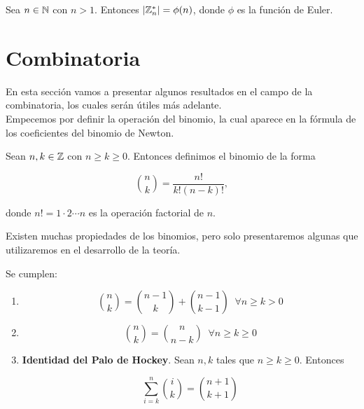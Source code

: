 \begin{proposicion}
	Sea $n \in \mathbb{N}$ con $n > 1$. Entonces $|\mathbb{Z}_n^*| = \phi(n)$, donde $\phi$ es la función de Euler.
\end{proposicion}

\section{Combinatoria}

En esta sección vamos a presentar algunos resultados en el campo de la combinatoria, los cuales serán útiles más adelante.\\

Empecemos por definir la operación del binomio, la cual aparece en la fórmula de los coeficientes del binomio de Newton.

\begin{definicion}
	Sean $n, k \in \mathbb{Z}$ con $n \geq k \geq 0$. Entonces definimos el binomio de la forma
	
	\begin{equation}\label{formula_binomio}
	\binom{n}{k} = \frac{n!}{k!(n - k)!},
	\end{equation}
	
	donde $n! = 1\cdot2\dotsm n$ es la operación factorial de $n$.
\end{definicion}

Existen muchas propiedades de los binomios, pero solo presentaremos algunas que utilizaremos en el desarrollo de la teoría.

\begin{proposicion}\label{propiedades_binomio}
	Se cumplen:
	
	\begin{enumerate}
		\item \[ \binom{n}{k} = \binom{n-1}{k} + \binom{n-1}{k-1}\;\;\forall n \geq k > 0 \]
		
		\item \[ \binom{n}{k} = \binom{n}{n-k}\;\;\forall n \geq k \geq 0 \]
		
		\item \textbf{Identidad del Palo de Hockey}. Sean $n, k$ tales que $n \geq k \geq 0$. Entonces
		
		\begin{equation}\label{identidad_del_palo_de_hockey}
		\sum_{i=k}^{n}\binom{i}{k} = \binom{n+1}{k+1}
		\end{equation}
	\end{enumerate}
\end{proposicion}

